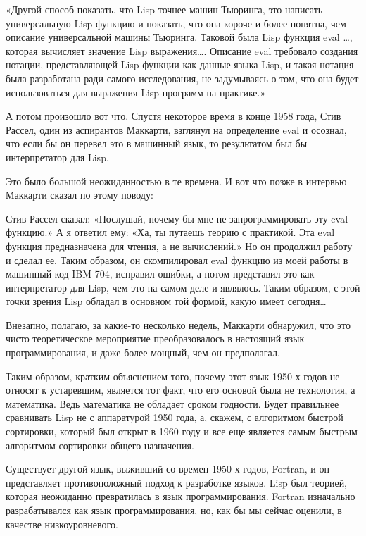\documentclass[ebook,12pt,oneside,openany]{memoir}
\begin{document}
«Другой способ показать, что Lisp точнее машин Тьюринга, это написать
универсальную Lisp функцию и показать, что она короче и более понятна,
чем описание универсальной машины Тьюринга. Таковой была Lisp функция
eval …, которая вычисляет значение Lisp выражения…. Описание eval
требовало создания нотации, представляющей Lisp функции как данные
языка Lisp, и такая нотация была разработана ради самого исследования,
не задумываясь о том, что она будет использоваться для выражения Lisp
программ на практике.»


А потом произошло вот что. Спустя некоторое время в конце 1958 года,
Стив Рассел, один из аспирантов Маккарти, взглянул на определение eval
и осознал, что если бы он перевел это в машинный язык, то результатом
был бы интерпретатор для Lisp.

Это было большой неожиданностью в те времена. И вот что позже в
интервью Маккарти сказал по этому поводу:

Стив Рассел сказал: «Послушай, почему бы мне не запрограммировать эту
eval функцию.» А я ответил ему: «Ха, ты путаешь теорию с практикой.
Эта eval функция предназначена для чтения, а не вычислений.» Но он
продолжил работу и сделал ее. Таким образом, он скомпилировал eval
функцию из моей работы в машинный код IBM 704, исправил ошибки, а
потом представил это как интерпретатор для Lisp, чем это на самом деле
и являлось. Таким образом, с этой точки зрения Lisp обладал в основном
той формой, какую имеет сегодня…


Внезапно, полагаю, за какие-то несколько недель, Маккарти обнаружил,
что это чисто теоретическое мероприятие преобразовалось в настоящий
язык программирования, и даже более мощный, чем он предполагал.

Таким образом, кратким объяснением того, почему этот язык 1950-х годов
не относят к устаревшим, является тот факт, что его основой была не
технология, а математика. Ведь математика не обладает сроком годности.
Будет правильнее сравнивать Lisp не с аппаратурой 1950 года, а,
скажем, с алгоритмом быстрой сортировки, который был открыт в 1960
году и все еще является самым быстрым алгоритмом сортировки общего
назначения.

Существует другой язык, выживший со времен 1950-х годов, Fortran, и он
представляет противоположный подход к разработке языков. Lisp был
теорией, которая неожиданно превратилась в язык программирования.
Fortran изначально разрабатывался как язык программирования, но, как
бы мы сейчас оценили, в качестве низкоуровневого.
\end{document}
